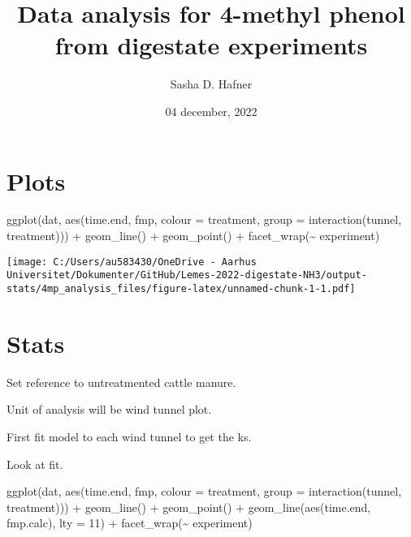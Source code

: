 \documentclass[
]{article}
\title{Data analysis for 4-methyl phenol from digestate experiments}
\author{Sasha D. Hafner}
\date{04 december, 2022}
\newenvironment{Shaded}{\begin{snugshade}}{\end{snugshade}}
\newcommand{\AttributeTok}[1]{\textcolor[rgb]{0.77,0.63,0.00}{#1}}
\newcommand{\FunctionTok}[1]{\textcolor[rgb]{0.00,0.00,0.00}{#1}}
\newcommand{\NormalTok}[1]{#1}
\newcommand{\SpecialCharTok}[1]{\textcolor[rgb]{0.00,0.00,0.00}{#1}}
\newcommand{\StringTok}[1]{\textcolor[rgb]{0.31,0.60,0.02}{#1}}
\begin{document}
\maketitle

\hypertarget{plots}{%
\section{Plots}\label{plots}}

\begin{Shaded}
\begin{Highlighting}[]
\FunctionTok{ggplot}\NormalTok{(dat, }\FunctionTok{aes}\NormalTok{(time.end, fmp, }\AttributeTok{colour =}\NormalTok{ treatment, }\AttributeTok{group =} \FunctionTok{interaction}\NormalTok{(tunnel, treatment))) }\SpecialCharTok{+}
  \FunctionTok{geom\_line}\NormalTok{() }\SpecialCharTok{+}
  \FunctionTok{geom\_point}\NormalTok{() }\SpecialCharTok{+}
  \FunctionTok{facet\_wrap}\NormalTok{(}\SpecialCharTok{\textasciitilde{}}\NormalTok{ experiment)}
\end{Highlighting}
\end{Shaded}

\texttt{[image: C:/Users/au583430/OneDrive - Aarhus Universitet/Dokumenter/GitHub/Lemes-2022-digestate-NH3/output-stats/4mp\_analysis\_files/figure-latex/unnamed-chunk-1-1.pdf]}

\hypertarget{stats}{%
\section{Stats}\label{stats}}

Set reference to untreatmented cattle manure.

Unit of analysis will be wind tunnel plot.

First fit model to each wind tunnel to get the ks.

Look at fit.

\begin{Shaded}
\begin{Highlighting}[]
\FunctionTok{ggplot}\NormalTok{(dat, }\FunctionTok{aes}\NormalTok{(time.end, fmp, }\AttributeTok{colour =}\NormalTok{ treatment, }\AttributeTok{group =} \FunctionTok{interaction}\NormalTok{(tunnel, treatment))) }\SpecialCharTok{+}
  \FunctionTok{geom\_line}\NormalTok{() }\SpecialCharTok{+}
  \FunctionTok{geom\_point}\NormalTok{() }\SpecialCharTok{+}
  \FunctionTok{geom\_line}\NormalTok{(}\FunctionTok{aes}\NormalTok{(time.end, fmp.calc), }\AttributeTok{lty =} \StringTok{\textquotesingle{}11\textquotesingle{}}\NormalTok{) }\SpecialCharTok{+}
  \FunctionTok{facet\_wrap}\NormalTok{(}\SpecialCharTok{\textasciitilde{}}\NormalTok{ experiment)}
\end{Highlighting}
\end{Shaded}
\end{document}
